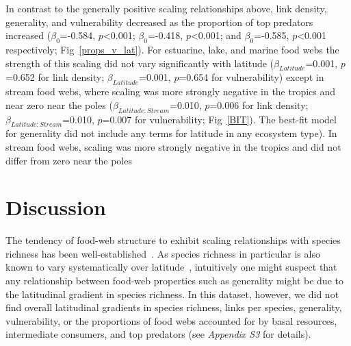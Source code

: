 \documentclass[12pt]{article}
\begin{document}
  In contrast to the generally positive scaling relationships above, link
  density, generality, and vulnerability decreased as the proportion of top
  predators increased ($\beta_0$=-0.584, $p$\textless0.001; $\beta_0$=-0.418,
  $p$\textless0.001; and $\beta_0$=-0.585, $p$\textless0.001 respectively;
  Fig~\ref{props_v_lat}). For estuarine, lake, and marine food webs the
  strength of this scaling did not vary significantly with latitude
  ($\beta_{Latitude}$=0.001, $p$=0.652 for link density;
  $\beta_{Latitude}$=0.001, $p$=0.654 for vulnerability) except in stream food
  webs, where scaling was more strongly negative in the tropics and near zero
  near the poles ($\beta_{Latitude:Stream}$=0.010, $p$=0.006 for link density;
  $\beta_{Latitude:Stream}$=0.010, $p$=0.007 for vulnerability;
  Fig~\ref{BIT}). The best-fit model for generality did not include any terms
  for latitude in any ecosystem type). In stream food webs, scaling was more
  strongly negative in the tropics and did not differ from zero near the poles



\section*{Discussion}

  The tendency of food-web structure to exhibit scaling relationships with
  species richness has been well-established~\citep{Dunne2004,Riede2010}. As
  species richness in particular is also known to vary systematically over
  latitude~\citep{Kaufman1995,Schemske2009,Macpherson2002}, intuitively one
  might suspect that any relationship between food-web properties such as
  generality might be due to the latitudinal gradient in species richness. In
  this dataset, however, we did not find overall latitudinal gradients in
  species richness, links per species,  generality, vulnerability, or the
  proportions of food webs accounted for by  basal resources, intermediate
  consumers, and top predators (see \emph{Appendix S3} for details).
\end{document}
